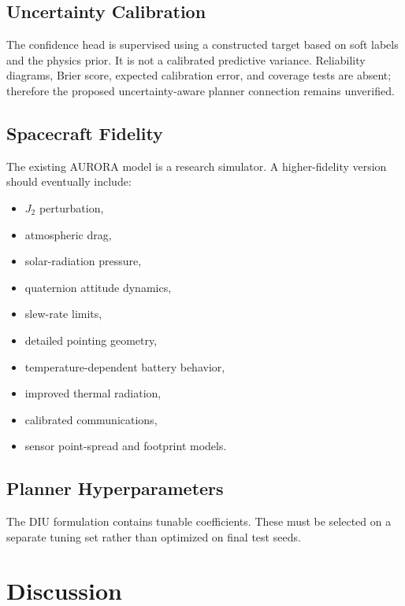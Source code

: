 \documentclass[11pt,a4paper]{article}
\begin{document}
\subsection{Uncertainty Calibration}

The confidence head is supervised using a constructed target based on
soft labels and the physics prior. It is not a calibrated predictive
variance. Reliability diagrams, Brier score, expected calibration
error, and coverage tests are absent; therefore the proposed
uncertainty-aware planner connection remains unverified.

\subsection{Spacecraft Fidelity}

The existing AURORA model is a research simulator. A higher-fidelity
version should eventually include:

\begin{itemize}
\item $J_2$ perturbation,
\item atmospheric drag,
\item solar-radiation pressure,
\item quaternion attitude dynamics,
\item slew-rate limits,
\item detailed pointing geometry,
\item temperature-dependent battery behavior,
\item improved thermal radiation,
\item calibrated communications,
\item sensor point-spread and footprint models.
\end{itemize}

\subsection{Planner Hyperparameters}

The DIU formulation contains tunable coefficients. These must be
selected on a separate tuning set rather than optimized on final test
seeds.


\section{Discussion}
\end{document}
